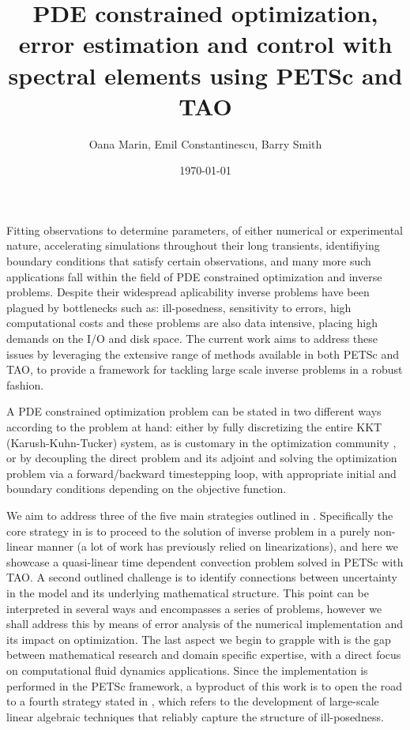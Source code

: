 \documentclass[10pt]{article}
\begin{document}

\title{PDE constrained optimization, error estimation and control with spectral elements using PETSc and TAO}
\vspace{1cm}
\author{Oana Marin, Emil Constantinescu, Barry Smith}
\date{\today}
\maketitle

Fitting observations to determine parameters, of either numerical or experimental nature, accelerating simulations throughout their long transients, identifiying  boundary conditions that satisfy certain observations, and many more such applications fall within the field of PDE constrained optimization and inverse problems. Despite their widespread aplicability inverse problems have been plagued by bottlenecks such as: ill-posedness, sensitivity to errors, high computational costs and these problems are also data intensive, placing high demands on the I/O and disk space. The current work aims to address these issues by leveraging the extensive range of methods available in both PETSc and TAO, to provide a framework for tackling large scale inverse problems in a robust fashion.


A PDE constrained optimization problem can be stated in two different ways according to the problem at hand: either by fully discretizing the entire KKT (Karush-Kuhn-Tucker) system, as is customary in the optimization community \cite{Haber_2007}, or by decoupling the direct problem and its adjoint and solving the optimization problem via a forward/backward timestepping loop, with appropriate initial and boundary conditions depending on the objective function.

We aim to address three of the five main strategies outlined in \cite{Brown_2008}. Specifically the core strategy in \cite{Brown_2008} is to proceed to the solution of inverse problem in a purely non-linear manner (a lot of work has previously relied on linearizations), and here we showcase a quasi-linear time dependent convection problem solved in PETSc with TAO. A second outlined challenge is to identify connections between uncertainty in the model and its underlying mathematical structure. This point can be interpreted in several ways and encompasses a series of problems, however we shall address this by means of error analysis of the numerical implementation and its impact on optimization. The last aspect we begin to grapple with is the gap between mathematical research and domain specific expertise, with a direct focus on computational fluid dynamics applications. Since the implementation is performed in the PETSc framework, a byproduct of this work is to open the road to a fourth strategy stated in \cite{Brown_2008}, which refers to the development of large-scale linear algebraic techniques that reliably capture the structure of ill-posedness. 
\end{document}
